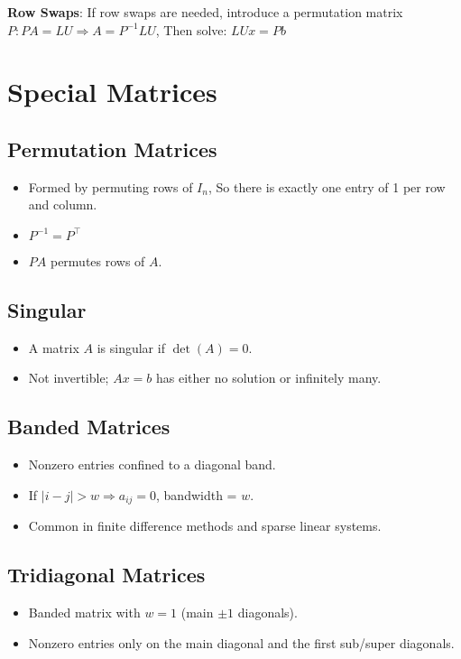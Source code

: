 \documentclass[8pt, letterpaper]{extarticle}
\begin{document}
\begin{multicols*}{3}
  \textbf{Row Swaps}:
  If row swaps are needed, introduce a permutation matrix 
  $P:PA = LU \Rightarrow A = P^{-1}LU$,
  Then solve: $ LUx = Pb $

  \section{Special Matrices}
  \subsection{Permutation Matrices}
  \begin{itemize}
    \item Formed by permuting rows of $I_n$, So there is exactly one entry of 1
      per row and column.
    \item $P^{-1} = P^\top$
    \item $PA$ permutes rows of $A$.
  \end{itemize}

  \subsection{Singular}
  \begin{itemize}
    \item A matrix $A$ is singular if $\det(A) = 0$.
    \item Not invertible; $ Ax = b $ has either no solution or infinitely many.
  \end{itemize}

  \subsection{Banded Matrices}
  \begin{itemize}
    \item Nonzero entries confined to a diagonal band.
    \item If $|i - j| > w \Rightarrow a_{ij} = 0$, bandwidth = $w$.
    \item Common in finite difference methods and sparse linear systems.
  \end{itemize}

  \subsection{Tridiagonal Matrices}
  \begin{itemize}
    \item Banded matrix with $w=1$ (main $\pm 1$ diagonals).
    \item Nonzero entries only on the main diagonal and the first sub/super
      diagonals.
  \end{itemize}


\end{multicols*}
\end{document}
